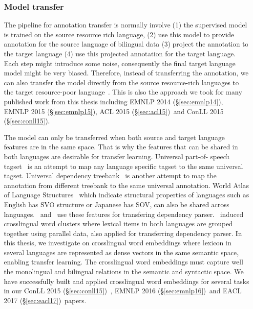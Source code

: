 \documentclass[12pt,twoside,final,hidelinks]{ltthesis}
\theoremstyle{definition}
\newcommand\emnlpiv{EMNLP 2014 (\S\ref{sec:emnlp14})}
\newcommand\conllv{ConLL 2015 (\S\ref{sec:conll15})}
\newcommand\aclv{ACL 2015 (\S\ref{sec:acl15})}
\newcommand\emnlpv{EMNLP 2015 (\S\ref{sec:emnlp15})}
\newcommand\emnlpvi{EMNLP 2016 (\S\ref{sec:emnlp16})}
\newcommand\eaclvii{EACL 2017 (\S\ref{sec:eacl17})}
\begin{document}
\subsubsection{Model transfer}
The pipeline for annotation transfer is normally involve (1) the supervised model is trained on the source resource rich language, (2) use this model to provide annotation 
for the source language of bilingual data (3) project the annotation to the target language 
(4) use this projected annotation for the target language. Each step might introduce some 
noise, consequently the final target language model might be very biased. Therefore, instead 
of transferring the annotation, we can also transfer the model directly from the source 
resource-rich languages to the target resource-poor language~\cite{Zeman08cross-languageparser,P14-1126}. This is also the approach we took for many published work from this thesis including \emnlpiv, \emnlpv, \aclv\ and \conllv.  

The model can only be transferred when both source and target language features are in the same space. 
That is why the features that can be shared in both languages are desirable for transfer learning. Universal part-of-
speech tagset~\cite{UniversalTagSet} is an attempt to map any language specific tagset to the 
same universal tagset. Universal dependency treebank~\cite{11234/1-1699} is another attempt to 
map the annotation from different treebank to the same universal annotation. World Atlas of 
Language Structures~\cite{wals} which indicate structural properties of languages such as 
English has SVO structure or Japanese has SOV, can also be shared across 
languages.~ and~ use these 
features for transfering dependency parser.~ induced crosslingual 
word clusters where lexical items in both languages are grouped together using parallel data, also applied for transferring dependency parser. In this thesis, we 
investigate on crosslingual word embeddings where lexicon in several languages are represented 
as dense vectors in the same semantic space, enabling transfer learning. The crosslingual word 
embeddings must capture well the monolingual and bilingual relations in the semantic and 
syntactic space. We have successfully built and applied crosslingual word embeddings for several 
tasks in our \conllv\ , \emnlpvi\ and \eaclvii\ papers. 
\end{document}
